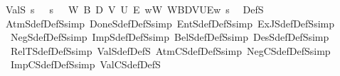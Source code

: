 \begin{isabellebody}
\isamarkupfalse%
\ ValS\ {\isacharparenleft}{\kern0pt}{\isachardoublequoteopen}{\isasymTurnstile}\isactrlsup s\ {\isacharunderscore}{\kern0pt}{\isachardoublequoteclose}{\isacharparenright}{\kern0pt}\ \ {\isachardoublequoteopen}{\isasymTurnstile}\isactrlsup s\ {\isasymphi}\ {\isasymequiv}\ {\isasymforall}W\ B\ D\ V\ U\ E{\isachardot}{\kern0pt}\ {\isasymforall}w{\isacharcolon}{\kern0pt}W{\isachardot}{\kern0pt}\ {\isasymlangle}W{\isacharcomma}{\kern0pt}B{\isacharcomma}{\kern0pt}D{\isacharcomma}{\kern0pt}V{\isacharcomma}{\kern0pt}U{\isacharcomma}{\kern0pt}E{\isasymrangle}{\isacharcomma}{\kern0pt}w\ {\isasymTurnstile}\isactrlsup s\ {\isasymphi}{\isachardoublequoteclose}\isanewline
\isanewline
{}\isamarkupfalse%
\ DefS\isanewline
{}\isamarkupfalse%
\ AtmS{\isacharunderscore}{\kern0pt}def{\isacharbrackleft}{\kern0pt}DefS{\isacharcomma}{\kern0pt}simp{\isacharbrackright}{\kern0pt}\ DoneS{\isacharunderscore}{\kern0pt}def{\isacharbrackleft}{\kern0pt}DefS{\isacharcomma}{\kern0pt}simp{\isacharbrackright}{\kern0pt}\ EntS{\isacharunderscore}{\kern0pt}def{\isacharbrackleft}{\kern0pt}DefS{\isacharcomma}{\kern0pt}simp{\isacharbrackright}{\kern0pt}\ ExJS{\isacharunderscore}{\kern0pt}def{\isacharbrackleft}{\kern0pt}DefS{\isacharcomma}{\kern0pt}simp{\isacharbrackright}{\kern0pt}\isanewline
\ \ NegS{\isacharunderscore}{\kern0pt}def{\isacharbrackleft}{\kern0pt}DefS{\isacharcomma}{\kern0pt}simp{\isacharbrackright}{\kern0pt}\ ImpS{\isacharunderscore}{\kern0pt}def{\isacharbrackleft}{\kern0pt}DefS{\isacharcomma}{\kern0pt}simp{\isacharbrackright}{\kern0pt}\ BelS{\isacharunderscore}{\kern0pt}def{\isacharbrackleft}{\kern0pt}DefS{\isacharcomma}{\kern0pt}simp{\isacharbrackright}{\kern0pt}\ DesS{\isacharunderscore}{\kern0pt}def{\isacharbrackleft}{\kern0pt}DefS{\isacharcomma}{\kern0pt}simp{\isacharbrackright}{\kern0pt}\isanewline
\ \ RelTS{\isacharunderscore}{\kern0pt}def{\isacharbrackleft}{\kern0pt}DefS{\isacharcomma}{\kern0pt}simp{\isacharbrackright}{\kern0pt}\ ValS{\isacharunderscore}{\kern0pt}def{\isacharbrackleft}{\kern0pt}DefS{\isacharbrackright}{\kern0pt}\ AtmCS{\isacharunderscore}{\kern0pt}def{\isacharbrackleft}{\kern0pt}DefS{\isacharcomma}{\kern0pt}simp{\isacharbrackright}{\kern0pt}\ NegCS{\isacharunderscore}{\kern0pt}def{\isacharbrackleft}{\kern0pt}DefS{\isacharcomma}{\kern0pt}simp{\isacharbrackright}{\kern0pt}\isanewline
\ \ ImpCS{\isacharunderscore}{\kern0pt}def{\isacharbrackleft}{\kern0pt}DefS{\isacharcomma}{\kern0pt}simp{\isacharbrackright}{\kern0pt}\ ValCS{\isacharunderscore}{\kern0pt}def{\isacharbrackleft}{\kern0pt}DefS{\isacharbrackright}{\kern0pt}\isanewline
%
\isadelimtheory
\isanewline
%
\endisadelimtheory
%
\isatagtheory
{}\isamarkupfalse%
%
\endisatagtheory
{\isafoldtheory}%
%
\isadelimtheory
%
\endisadelimtheory
%
\end{isabellebody}%
